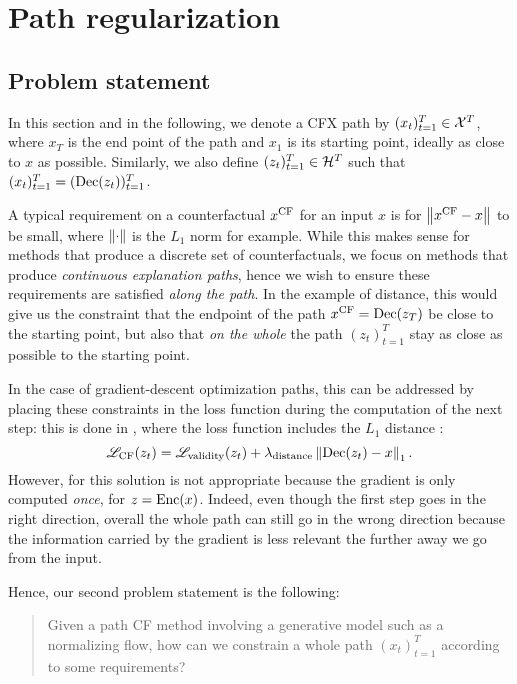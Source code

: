 \documentclass[../main.tex]{subfiles}
\begin{document}
\section{Path regularization}

\subsection{Problem statement}

In this section and in the following, we denote a CFX path by $(x_t)_{t=1}^T \in \mathcal{X}^T$, where $x_T$ is the end point of the path and
$x_1$ is its starting point, ideally as close to $x$ as possible.
Similarly, we also define $(z_t)_{t=1}^T \in \mathcal{H}^T$ such that $(x_t)_{t=1}^T = (\operatorname{Dec}(z_t))_{t=1}^T$.

A typical requirement on a counterfactual $x^\mathrm{CF}$ for an input $x$ is for $\left\lVert x^\mathrm{CF} - x\right\rVert$ to be small, where $\left\lVert\cdot\right\rVert$ is the $L_1$ norm for example.
While this makes sense for methods that produce a discrete set of counterfactuals, we focus on methods that produce \emph{continuous explanation paths}, hence we wish to ensure these requirements are satisfied \emph{along the path}.
In the example of distance, this would give us the constraint that the endpoint of the path $x^\mathrm{CF} = \operatorname{Dec}(z_T)$ be close to the starting point, but also that \emph{on the whole} the path $(z_t)_{t=1}^T$ stay as close as possible to the starting point.

In the case of gradient-descent optimization paths, this can be addressed by placing these constraints in the loss function during the computation of the next step: this is done in \revise{}, where the loss function includes the $L_1$ distance \cite{joshiRealistic2019}:
\begin{equation*}
\mathscr{L}_\text{CF}(z_t) = \mathscr{L}_\text{validity}(z_t) + \lambda_\text{distance} \left\lVert\operatorname{Dec}(z_t) - x\right\rVert_1.
\end{equation*}
However, for \ls{} this solution is not appropriate because the gradient is only computed \emph{once}, for $z = \operatorname{Enc}(x)$.
Indeed, even though the first step goes in the right direction, overall the whole path can still go in the wrong direction because the information carried by the gradient is less relevant the further away we go from the input.

Hence, our second problem statement is the following:
\begin{quote}
Given a path CF method involving a generative model such as a normalizing flow,
how can we constrain a whole path $(x_t)_{t=1}^T$ according to some requirements?
\end{quote}
\end{document}
